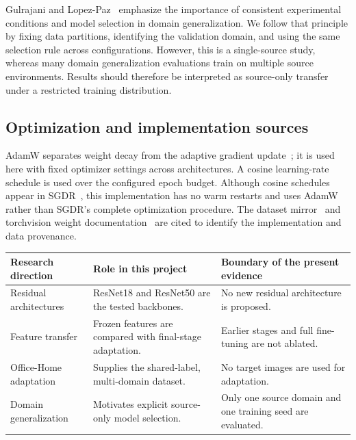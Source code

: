 \documentclass[10pt,a4paper]{article}
\begin{document}
Gulrajani and Lopez-Paz~\cite{domainbed} emphasize the importance of consistent experimental conditions and model selection in domain generalization. We follow that principle by fixing data partitions, identifying the validation domain, and using the same selection rule across configurations. However, this is a single-source study, whereas many domain generalization evaluations train on multiple source environments. Results should therefore be interpreted as source-only transfer under a restricted training distribution.

\subsection{Optimization and implementation sources}
AdamW separates weight decay from the adaptive gradient update~\cite{adamw}; it is used here with fixed optimizer settings across architectures. A cosine learning-rate schedule is used over the configured epoch budget. Although cosine schedules appear in SGDR~\cite{sgdr}, this implementation has no warm restarts and uses AdamW rather than SGDR's complete optimization procedure. The dataset mirror~\cite{mirror} and torchvision weight documentation~\cite{torchvision} are cited to identify the implementation and data provenance.

\begin{center}\begin{minipage}{\linewidth}\centering
{}
\begin{tabularx}{\linewidth}{p{3.8cm}XX}
\toprule
Research direction & Role in this project & Boundary of the present evidence\\
\midrule
Residual architectures & ResNet18 and ResNet50 are the tested backbones. & No new residual architecture is proposed.\\
Feature transfer & Frozen features are compared with final-stage adaptation. & Earlier stages and full fine-tuning are not ablated.\\
Office-Home adaptation & Supplies the shared-label, multi-domain dataset. & No target images are used for adaptation.\\
Domain generalization & Motivates explicit source-only model selection. & Only one source domain and one training seed are evaluated.\\
\bottomrule
\end{tabularx}
\end{minipage}\end{center}
\end{document}
